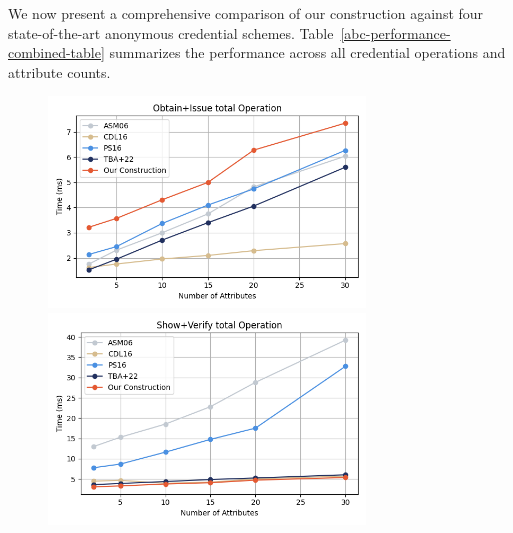 We now present a comprehensive comparison of our construction against four state-of-the-art anonymous credential schemes. Table~\ref{abc-performance-combined-table} summarizes the performance across all credential operations and attribute counts.

\begin{figure}
    \centering
    \begin{minipage}{\textwidth}
        \centering
        \includegraphics[width=0.75\textwidth]{figures/anoncreds_obtain_issue.png}
    \end{minipage}
    
    \vspace{0.05cm}
    
    \begin{minipage}{\textwidth}
        \centering
        \includegraphics[width=0.75\textwidth]{figures/anoncreds_show_verify.png}
    \end{minipage}
    
    \vspace{0.05cm}
    

\end{figure}
